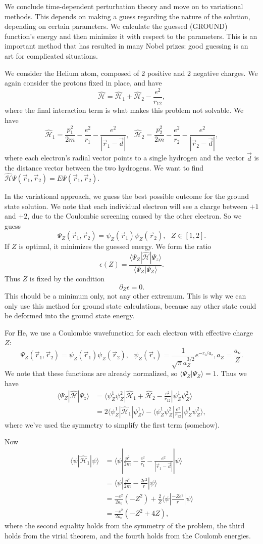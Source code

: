 \documentclass[fontsize=12pt]{scrartcl}
\newcommand{\ptl}{\partial}
\newcommand{\la}{\langle}
\newcommand{\ra}{\rangle}
\newcommand{\Ham}{\hat{\mathcal{H}}}
\begin{document}
We conclude time-dependent perturbation theory and move on to variational methods. This depends on making a guess regarding the nature of the solution, depending on certain parameters. We calculate the guessed (GROUND) function's energy and then minimize it with respect to the parameters. This is an important method that has resulted in many Nobel prizes: good guessing is an art for complicated situations.

We consider the Helium atom, composed of 2 positive and 2 negative charges. We again consider the protons fixed in place, and have $$\Ham=\Ham_1+\Ham_2-\frac{e^2}{r_{12}},$$ where the final interaction term is what makes this problem not solvable. We have $$\Ham_1 = \frac{p_1^2}{2m}-\frac{e^2}{r_1}-\frac{e^2}{|\vec{r}_1-\vec{d}|}, \ \ \ \Ham_2= \frac{p_2^2}{2m}-\frac{e^2}{r_2}-\frac{e^2}{|\vec{r}_2-\vec{d}|},$$ where each electron's radial vector points to a single hydrogen and the vector $\vec{d}$ is the distance vector between the two hydrogens. We want to find $\Ham\Psi(\vec{r}_1,\vec{r}_2)=E\Psi(\vec{r}_1,\vec{r}_2).$

In the variational approach, we guess the best possible outcome for the ground state solution. We note that each individual electron will see a charge between $+1$ and $+2$, due to the Coulombic screening caused by the other electron. So we guess $$\Psi_Z(\vec{r}_1,\vec{r}_2) = \psi_Z(\vec{r}_1)\psi_Z(\vec{r}_2), \ \ \ Z\in[1,2].$$ If $Z$ is optimal, it minimizes the guessed energy. We form the ratio $$\epsilon(Z)=\frac{\la \Psi_Z|\Ham|\Psi_z\ra}{\la\Psi_Z|\Psi_Z\ra}.$$ Thus $Z$ is fixed by the condition $$\ptl_Z\epsilon = 0.$$ This should be a minimum only, not any other extremum. This is why we can only use this method for ground state calculations, because any other state could be deformed into the ground state energy.

For He, we use a Coulombic wavefunction for each electron with effective charge $Z$: $$\Psi_Z(\vec{r}_1,\vec{r}_2)=\psi_Z(\vec{r}_1)\psi_Z(\vec{r}_2), \ \ \ \psi_Z(\vec{r}_i)=\frac{1}{\sqrt{\pi}a_Z^{3/2}}e^{-r_i/a_z}, a_Z=\frac{a_o}{Z}.$$ We note that these functions are already normalized, so $\la\Psi_Z|\Psi_Z\ra=1$. Thus we have \begin{align*}
\la \Psi_Z|\Ham|\Psi_z\ra &= \la \psi^1_Z\psi^2_Z|\Ham_1+\Ham_2-\frac{e^2}{r_{12}}|\psi_Z^1\psi_Z^2\ra\\
&= 2 \la \psi_Z^1|\Ham_1|\psi_Z^1\ra - \la\psi^1_Z\psi^2_Z|\frac{e^2}{r_{12}}|\psi_Z^1\psi_Z^2\ra,
\end{align*} where we've used the symmetry to simplify the first term (somehow).

Now \begin{align*}
\la \psi|\Ham_1|\psi\ra &= \la \psi | \frac{p^2}{2m}-\frac{e^2}{r_1}-\frac{e^2}{|\vec{r}_1-\vec{d}|}|\psi\ra \\
&= \la \psi|\frac{p^2}{2m}-\frac{2e^2}{r}|\psi\ra\\
&= \frac{-e^2}{2a_o}(-Z^2) + \frac{2}{Z}\la \psi|\frac{-Ze^2}{r}|\psi\ra \\
&= \frac{-e^2}{2a_o}(-Z^2+4Z), 
\end{align*} where the second equality holds from the symmetry of the problem, the third holds from the virial theorem, and the fourth holds from the Coulomb energies.
\end{document}
